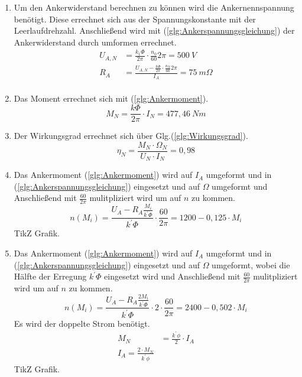 \begin{solution}
\begin{enumerate}
\item Um den Ankerwiderstand berechnen zu können wird die Ankernennspannung benötigt. Diese errechnet sich aus der Spannungskonstante mit der Leerlaufdrehzahl. Anschließend wird mit (\ref{glg:Ankerspannungsgleichung}) der Ankerwiderstand durch umformen errechnet.\\
\begin{align}
U_{A,N} &= \frac{k_1 \Phi}{2 \pi} \cdot \frac{n_0}{60} 2 \pi = 500~V\\
R_A &= \frac{U_{A,N} - \frac{k \Phi}{2 \pi} \cdot \frac{n_N}{60} 2 \pi}{I_A}=75~m \Omega\\
\end{align}
\item Das Moment errechnet sich mit (\ref{glg:Ankermoment}).\\
\begin{equation}
M_N=\frac{k \Phi}{2 \pi} \cdot I_N =477,46~Nm
\end{equation}
\item Der Wirkungsgrad errechnet sich über Glg.(\ref{glg:Wirkungsgrad}).
\begin{equation}
\eta_N = \frac{M_N \cdot \Omega_N}{U_N \cdot I_N} =0,98
\end{equation}
\item Das Ankermoment (\ref{glg:Ankermoment}) wird auf $I_A$ umgeformt und in (\ref{glg:Ankerspannungsgleichung}) eingesetzt und auf $\Omega$ umgeformt und Anschließend mit $\frac{60}{2 \pi}$ mulitpliziert wird um auf $n$ zu kommen.
\begin{equation}
n(M_i) = \frac{U_A - R_A \frac{ M_i}{k^{'} \Phi}}{k^{'}\Phi} \cdot \frac{60}{2 \pi} =1200-0,125 \cdot M_i
\end{equation}
TikZ Grafik.\\
\item Das Ankermoment (\ref{glg:Ankermoment}) wird auf $I_A$ umgeformt und in (\ref{glg:Ankerspannungsgleichung}) eingesetzt und auf $\Omega$ umgeformt, wobei die Hälfte der Erregung $k^{'} \Phi$ eingesetzt wird und Anschließend mit $\frac{60}{2 \pi}$ mulitpliziert wird um auf $n$ zu kommen.
\begin{equation}
n(M_i) = \frac{U_A - R_A \frac{2 M_i}{k^{'} \Phi}}{k^{'}\Phi} \cdot 2 \cdot \frac{60}{2 \pi} =2400-0,502 \cdot M_i
\end{equation}
Es wird der doppelte Strom ben\"otigt.
\begin{align}
M_N &= \frac{k^{'} \phi}{2} \cdot I_A\\
I_A = \frac{2 \cdot M_N}{k^{'} \phi}
\end{align}
TikZ Grafik.\\
\end{enumerate}
\end{solution}